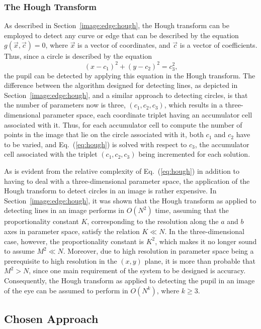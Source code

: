 \subsubsection{The Hough Transform}

As described in Section~\ref{image:edge:hough}, the Hough transform
can be employed to detect any curve or edge that can be described by
the equation $g(\vec{x},\vec{c})=0$, where $\vec{x}$ is a vector of
coordinates, and $\vec{c}$ is a vector of coefficients.  Thus, since a
circle is described by the equation
\begin{equation}
\label{eq:hough}
  (x-c_{1})^{2}+(y-c_{2})^{2}=c_{3}^{2}\mbox{,}
\end{equation}
the pupil can be detected by applying this equation in the Hough
transform.  The difference between the algorithm designed for
detecting lines, as depicted in Section~\ref{image:edge:hough}, and a
similar approach to detecting circles, is that the number of
parameters now is three, $(c_{1},c_{2},c_{3})$, which results in a
three-dimensional parameter space, each coordinate triplet having an
accumulator cell associated with it.  Thus, for each accumulator cell
to compute the number of points in the image that lie on the circle
associated with it, both $c_{1}$ and $c_{2}$ have to be varied, and
Eq.~(\ref{eq:hough}) is solved with respect to $c_{3}$, the
accumulator cell associated with the triplet $(c_{1},c_{2},c_{3})$
being incremented for each solution.

As is evident from the relative complexity of Eq.~(\ref{eq:hough}) in
addition to having to deal with a three-dimensional parameter space,
the application of the Hough transform to detect circles in an image
is rather expensive.  In Section~\ref{image:edge:hough}, it was shown
that the Hough transform as applied to detecting lines in an image
performs in $O(N^{2})$ time, assuming that the proportionality
constant $K$, corresponding to the resolution along the $a$ and $b$
axes in parameter space, satisfy the relation $K\ll N$.  In the
three-dimensional case, however, the proportionality constant is
$K^{2}$, which makes it no longer sound to assume $M^{2}\ll N$.
Moreover, due to high resolution in parameter space being a
prerequisite to high resolution in the $(x,y)$ plane, it is more than
probable that $M^{2}>N$, since one main requirement of the system to
be designed is accuracy.  Consequently, the Hough transform as applied
to detecting the pupil in an image of the eye can be assumed to
perform in $O(N^{k})$, where $k\geq 3$.

\subsection{Chosen Approach}
\label{image:concl:approach}

